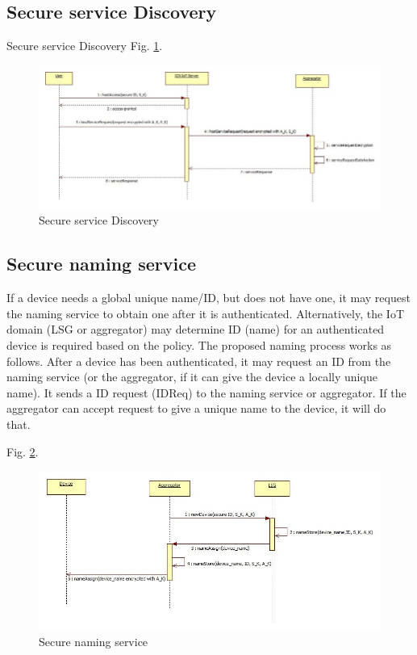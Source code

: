 \subsection{Secure service Discovery}
Secure service Discovery Fig. \ref{fig:Secure service Discovery}.
 \begin{figure}[h]
	\centering
	\includegraphics[width=0.8\linewidth]{Figures/Secure-service-discovery.png}
	\caption[]{Secure service Discovery}
	\label{fig:Secure service Discovery}
\end{figure}
\par
\subsection{Secure naming service}
If a device needs a global unique name/ID, but does not have one, it may request the naming service to obtain one after it is authenticated. Alternatively, the IoT domain (LSG or aggregator) may determine ID (name) for an authenticated device is required based on the policy. The proposed naming process works as follows. After a device has been authenticated, it may request an ID from the naming service (or the aggregator, if it can give the device a locally unique name). It sends a ID request (IDReq) to the naming service or aggregator. If the aggregator can accept request to give a unique name to the device, it will do that.\par
 Fig. \ref{fig:Secure naming service}.
 \begin{figure}[h]
	\centering
	\includegraphics[width=0.8\linewidth]{Figures/Secure-naming-service.jpg}
	\caption[]{Secure naming service}
	\label{fig:Secure naming service}
\end{figure}
\par
